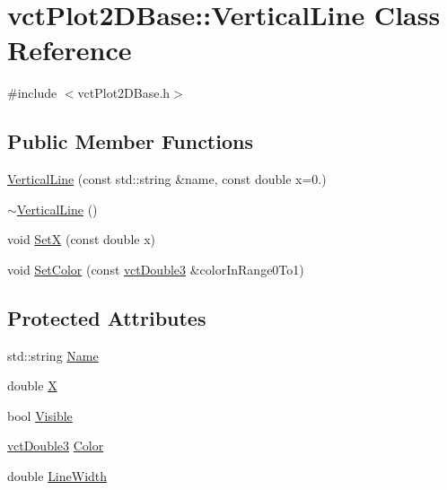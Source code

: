 \hypertarget{classvct_plot2_d_base_1_1_vertical_line}{\section{vct\-Plot2\-D\-Base\-:\-:Vertical\-Line Class Reference}
\label{classvct_plot2_d_base_1_1_vertical_line}
}


{\ttfamily \#include $<$vct\-Plot2\-D\-Base.\-h$>$}

\subsection*{Public Member Functions}
\begin{DoxyCompactItemize}
\item 
\hyperlink{classvct_plot2_d_base_1_1_vertical_line_aeead77065b65afbd7ede2c0325fb5d3f}{Vertical\-Line} (const std\-::string \&name, const double x=0.)
\item 
\hyperlink{classvct_plot2_d_base_1_1_vertical_line_a315c1187f6ff9025bbc5484e504d1deb}{$\sim$\-Vertical\-Line} ()
\item 
void \hyperlink{classvct_plot2_d_base_1_1_vertical_line_a8f4efef79cd5e28102125fc208bf4ae7}{Set\-X} (const double x)
\item 
void \hyperlink{classvct_plot2_d_base_1_1_vertical_line_ac9abc49458204fba8a4f1dfa7c7df1ab}{Set\-Color} (const \hyperlink{vct_fixed_size_vector_types_8h_a4a89122c9d7f72c3f31fe8126e17c3af}{vct\-Double3} \&color\-In\-Range0\-To1)
\end{DoxyCompactItemize}
\subsection*{Protected Attributes}
\begin{DoxyCompactItemize}
\item 
std\-::string \hyperlink{classvct_plot2_d_base_1_1_vertical_line_a5aa26599db259440cfa96c967835417d}{Name}
\item 
double \hyperlink{classvct_plot2_d_base_1_1_vertical_line_a49c77c7144675b46d5a89342732b96eb}{X}
\item 
bool \hyperlink{classvct_plot2_d_base_1_1_vertical_line_a9f71e6ff1a3da3b6bf0f151720e277ca}{Visible}
\item 
\hyperlink{vct_fixed_size_vector_types_8h_a4a89122c9d7f72c3f31fe8126e17c3af}{vct\-Double3} \hyperlink{classvct_plot2_d_base_1_1_vertical_line_a45aab4a21d404c07843224e6c3c9ebd1}{Color}
\item 
double \hyperlink{classvct_plot2_d_base_1_1_vertical_line_a36cbedb02fb55b387933cd6db1782562}{Line\-Width}
\end{DoxyCompactItemize}
